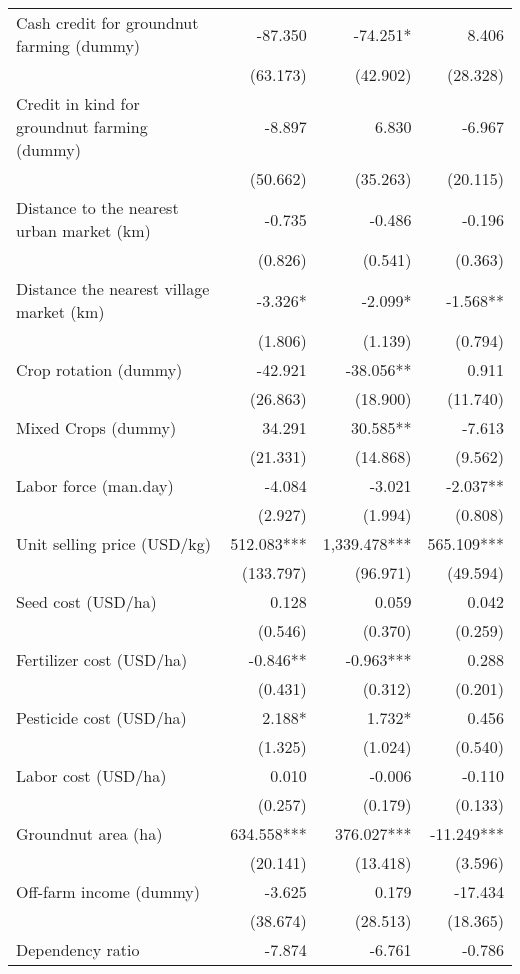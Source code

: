 \documentclass[
]{article}
\begin{document}
\begin{longtable}[t]{lrrr}
\addlinespace
Cash credit for groundnut farming (dummy) & -87.350 & -74.251* & 8.406\\
 & (63.173) & (42.902) & (28.328)\\
Credit in kind for groundnut farming (dummy) & -8.897 & 6.830 & -6.967\\
 & (50.662) & (35.263) & (20.115)\\
Distance to the nearest urban market (km) & -0.735 & -0.486 & -0.196\\
\addlinespace
 & (0.826) & (0.541) & (0.363)\\
Distance the nearest village market (km) & -3.326* & -2.099* & -1.568**\\
 & (1.806) & (1.139) & (0.794)\\
Crop rotation (dummy) & -42.921 & -38.056** & 0.911\\
 & (26.863) & (18.900) & (11.740)\\
\addlinespace
Mixed Crops (dummy) & 34.291 & 30.585** & -7.613\\
 & (21.331) & (14.868) & (9.562)\\
Labor force (man.day) & -4.084 & -3.021 & -2.037**\\
 & (2.927) & (1.994) & (0.808)\\
Unit selling price (USD/kg) & 512.083*** & 1,339.478*** & 565.109***\\
\addlinespace
 & (133.797) & (96.971) & (49.594)\\
Seed cost (USD/ha) & 0.128 & 0.059 & 0.042\\
 & (0.546) & (0.370) & (0.259)\\
Fertilizer cost (USD/ha) & -0.846** & -0.963*** & 0.288\\
 & (0.431) & (0.312) & (0.201)\\
\addlinespace
Pesticide cost (USD/ha) & 2.188* & 1.732* & 0.456\\
 & (1.325) & (1.024) & (0.540)\\
Labor cost (USD/ha) & 0.010 & -0.006 & -0.110\\
 & (0.257) & (0.179) & (0.133)\\
Groundnut area (ha) & 634.558*** & 376.027*** & -11.249***\\
\addlinespace
 & (20.141) & (13.418) & (3.596)\\
Off-farm income (dummy) & -3.625 & 0.179 & -17.434\\
 & (38.674) & (28.513) & (18.365)\\
Dependency ratio & -7.874 & -6.761 & -0.786\\

\end{longtable}
\end{document}

